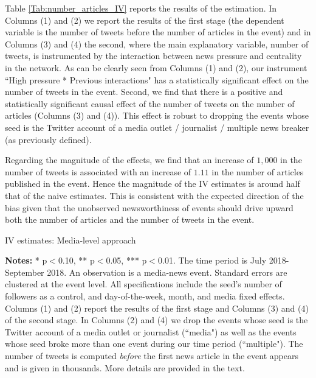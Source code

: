 Table \ref{Tab:number_articles_IV} reports the results of the estimation. In Columns (1) and (2) we report the results of the first stage (the dependent variable is the number of tweets before the number of articles in the event) and in Columns (3) and (4) the second, where the main explanatory variable, number of tweets, is instrumented by the interaction between news pressure and centrality in the network. As can be clearly seen from Columns (1) and (2), our instrument ``High pressure * Previous interactions" has a statistically significant effect on the number of tweets in the event. Second, we find that there is a positive and statistically significant causal effect of the number of tweets on the number of articles (Columns (3) and (4)). This effect is robust to dropping the events whose seed is the Twitter account of a media outlet / journalist / multiple news breaker (as previously defined).

Regarding the magnitude of the effects, we find that an increase of $1,000$ in the number of tweets is associated with an increase of $1.11$ in the number of articles published in the event. Hence the magnitude of the IV estimates is around half that of the naive estimates. This is consistent with the expected direction of the bias given that the unobserved newsworthiness of events should drive upward both the number of articles and the number of tweets in the event.


\begin{table}
\caption{IV estimates: Media-level approach}
\begin{center}
	
\end{center}
\begin{spacing}{0.5}
	{\fns \textbf{Notes:} * p$<$0.10, ** p$<$0.05, *** p$<$0.01. The time period is July 2018-September 2018.  An observation is a media-news event. Standard errors are clustered at the event level. All specifications include the seed's number of followers as a control, and day-of-the-week, month, and media fixed effects. Columns (1) and (2) report the results of the first stage and Columns (3) and (4) of the second stage. In Columns (2) and (4) we drop the events whose seed is the Twitter account of a media outlet or journalist (``media") as well as the events whose seed broke more than one event during our time period (``multiple"). The number of tweets is computed \textit{before} the first news article in the event appears and is given in thousands. More details are provided in the text.}
\end{spacing}
\label{Tab:number_articles_IV}
\end{table} 


